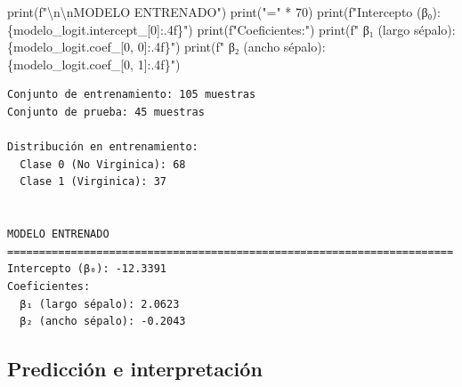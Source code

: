 \documentclass[
  doc,
  floatsintext,
  longtable,
  a4paper,
  nolmodern,
  notxfonts,
  notimes,
  12pt,
  colorlinks=true,linkcolor=blue,citecolor=blue,urlcolor=blue]{apa7}
\newenvironment{Shaded}{\begin{snugshade}}{\end{snugshade}}
\newcommand{\BuiltInTok}[1]{\textcolor[rgb]{0.00,0.23,0.31}{#1}}
\newcommand{\CharTok}[1]{\textcolor[rgb]{0.13,0.47,0.30}{#1}}
\newcommand{\DecValTok}[1]{\textcolor[rgb]{0.68,0.00,0.00}{#1}}
\newcommand{\NormalTok}[1]{\textcolor[rgb]{0.00,0.23,0.31}{#1}}
\newcommand{\OperatorTok}[1]{\textcolor[rgb]{0.37,0.37,0.37}{#1}}
\newcommand{\SpecialCharTok}[1]{\textcolor[rgb]{0.37,0.37,0.37}{#1}}
\newcommand{\SpecialStringTok}[1]{\textcolor[rgb]{0.13,0.47,0.30}{#1}}
\newcommand{\StringTok}[1]{\textcolor[rgb]{0.13,0.47,0.30}{#1}}
\begin{document}
\begin{Shaded}
\begin{Highlighting}[]
\BuiltInTok{print}\NormalTok{(}\SpecialStringTok{f"}\CharTok{\textbackslash{}n\textbackslash{}n}\SpecialStringTok{MODELO ENTRENADO"}\NormalTok{)}
\BuiltInTok{print}\NormalTok{(}\StringTok{"="} \OperatorTok{*} \DecValTok{70}\NormalTok{)}
\BuiltInTok{print}\NormalTok{(}\SpecialStringTok{f"Intercepto (β₀): }\SpecialCharTok{\{}\NormalTok{modelo\_logit}\SpecialCharTok{.}\NormalTok{intercept\_[}\DecValTok{0}\NormalTok{]}\SpecialCharTok{:.4f\}}\SpecialStringTok{"}\NormalTok{)}
\BuiltInTok{print}\NormalTok{(}\SpecialStringTok{f"Coeficientes:"}\NormalTok{)}
\BuiltInTok{print}\NormalTok{(}\SpecialStringTok{f"  β₁ (largo sépalo): }\SpecialCharTok{\{}\NormalTok{modelo\_logit}\SpecialCharTok{.}\NormalTok{coef\_[}\DecValTok{0}\NormalTok{, }\DecValTok{0}\NormalTok{]}\SpecialCharTok{:.4f\}}\SpecialStringTok{"}\NormalTok{)}
\BuiltInTok{print}\NormalTok{(}\SpecialStringTok{f"  β₂ (ancho sépalo): }\SpecialCharTok{\{}\NormalTok{modelo\_logit}\SpecialCharTok{.}\NormalTok{coef\_[}\DecValTok{0}\NormalTok{, }\DecValTok{1}\NormalTok{]}\SpecialCharTok{:.4f\}}\SpecialStringTok{"}\NormalTok{)}
\end{Highlighting}
\end{Shaded}

\begin{verbatim}
Conjunto de entrenamiento: 105 muestras
Conjunto de prueba: 45 muestras

Distribución en entrenamiento:
  Clase 0 (No Virginica): 68
  Clase 1 (Virginica): 37


MODELO ENTRENADO
======================================================================
Intercepto (β₀): -12.3391
Coeficientes:
  β₁ (largo sépalo): 2.0623
  β₂ (ancho sépalo): -0.2043
\end{verbatim}

\subsection{Predicción e
interpretación}\label{predicciuxf3n-e-interpretaciuxf3n}
\end{document}
